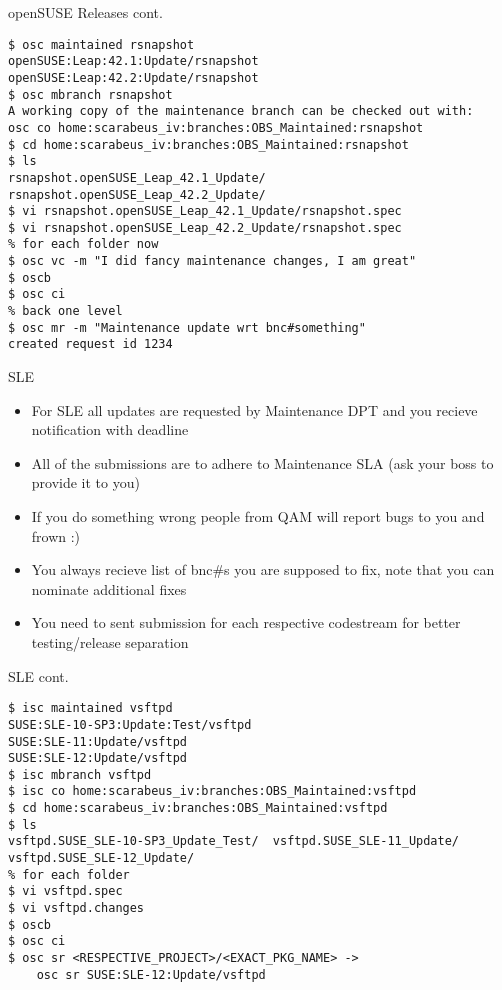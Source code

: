 \documentclass{beamer}
\begin{document}
\begin{frame}[fragile]{openSUSE Releases cont.}
	\begin{tiny}
	\begin{verbatim}
$ osc maintained rsnapshot
openSUSE:Leap:42.1:Update/rsnapshot
openSUSE:Leap:42.2:Update/rsnapshot
$ osc mbranch rsnapshot
A working copy of the maintenance branch can be checked out with:
osc co home:scarabeus_iv:branches:OBS_Maintained:rsnapshot
$ cd home:scarabeus_iv:branches:OBS_Maintained:rsnapshot
$ ls
rsnapshot.openSUSE_Leap_42.1_Update/  rsnapshot.openSUSE_Leap_42.2_Update/
$ vi rsnapshot.openSUSE_Leap_42.1_Update/rsnapshot.spec
$ vi rsnapshot.openSUSE_Leap_42.2_Update/rsnapshot.spec
% for each folder now
$ osc vc -m "I did fancy maintenance changes, I am great"
$ oscb
$ osc ci
% back one level
$ osc mr -m "Maintenance update wrt bnc#something"
created request id 1234
	\end{verbatim}
	\end{tiny}
\end{frame}

\begin{frame}[t]{SLE}
	\begin{itemize}
	\item For SLE all updates are requested by Maintenance DPT and you recieve notification with deadline
	\item All of the submissions are to adhere to Maintenance SLA (ask your boss to provide it to you)
	\item If you do something wrong people from QAM will report bugs to you and frown :)
	\item You always recieve list of bnc\#s you are supposed to fix, note that you can nominate additional fixes
	\item You need to sent submission for each respective codestream for better testing/release separation
	\end{itemize}
\end{frame}

\begin{frame}[fragile]{SLE cont.}
	\begin{tiny}
	\begin{verbatim}
$ isc maintained vsftpd
SUSE:SLE-10-SP3:Update:Test/vsftpd
SUSE:SLE-11:Update/vsftpd
SUSE:SLE-12:Update/vsftpd
$ isc mbranch vsftpd
$ isc co home:scarabeus_iv:branches:OBS_Maintained:vsftpd
$ cd home:scarabeus_iv:branches:OBS_Maintained:vsftpd
$ ls
vsftpd.SUSE_SLE-10-SP3_Update_Test/  vsftpd.SUSE_SLE-11_Update/ vsftpd.SUSE_SLE-12_Update/
% for each folder
$ vi vsftpd.spec
$ vi vsftpd.changes
$ oscb
$ osc ci
$ osc sr <RESPECTIVE_PROJECT>/<EXACT_PKG_NAME> ->
	osc sr SUSE:SLE-12:Update/vsftpd
	\end{verbatim}
	\end{tiny}
\end{frame}
\end{document}
